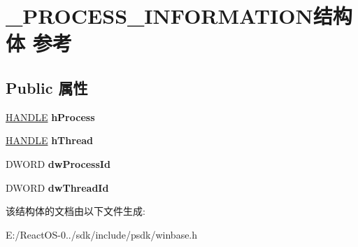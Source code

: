 \hypertarget{struct___p_r_o_c_e_s_s___i_n_f_o_r_m_a_t_i_o_n}{}\section{\+\_\+\+P\+R\+O\+C\+E\+S\+S\+\_\+\+I\+N\+F\+O\+R\+M\+A\+T\+I\+O\+N结构体 参考}
\label{struct___p_r_o_c_e_s_s___i_n_f_o_r_m_a_t_i_o_n}
\subsection*{Public 属性}
\begin{DoxyCompactItemize}
\item 
\mbox{\label{struct___p_r_o_c_e_s_s___i_n_f_o_r_m_a_t_i_o_n_a526997c94adca4c0ac9657178f9cb61c}} 
\hyperlink{interfacevoid}{H\+A\+N\+D\+LE} {\bfseries h\+Process}
\item 
\mbox{\label{struct___p_r_o_c_e_s_s___i_n_f_o_r_m_a_t_i_o_n_a095dc9bc08fd611dfbac174129f6a2ba}} 
\hyperlink{interfacevoid}{H\+A\+N\+D\+LE} {\bfseries h\+Thread}
\item 
\mbox{\label{struct___p_r_o_c_e_s_s___i_n_f_o_r_m_a_t_i_o_n_af42551aab61538de86717129fbd1742c}} 
D\+W\+O\+RD {\bfseries dw\+Process\+Id}
\item 
\mbox{\label{struct___p_r_o_c_e_s_s___i_n_f_o_r_m_a_t_i_o_n_aa2db5c7d8ecf407ff830858b74dd57d2}} 
D\+W\+O\+RD {\bfseries dw\+Thread\+Id}
\end{DoxyCompactItemize}


该结构体的文档由以下文件生成\+:\begin{DoxyCompactItemize}
\item 
E\+:/\+React\+O\+S-\/0../sdk/include/psdk/winbase.\+h\end{DoxyCompactItemize}
